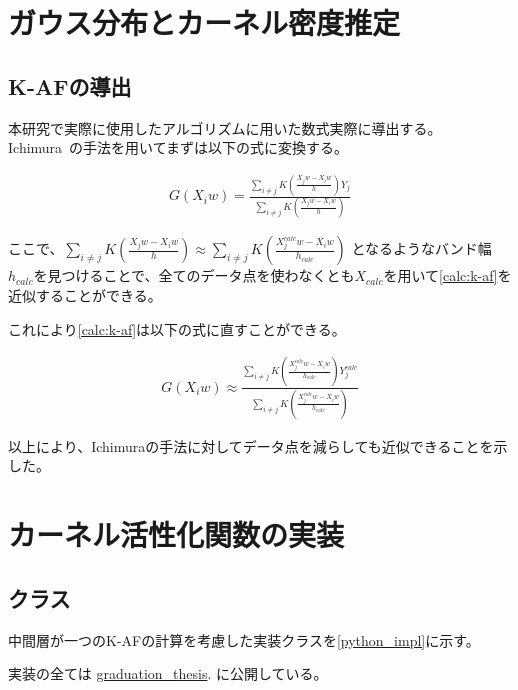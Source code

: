 \appendix
\chapter{ガウス分布とカーネル密度推定}


\section{K-AFの導出}
\label{appendix:calc}

本研究で実際に使用したアルゴリズムに用いた数式実際に導出する。
Ichimura~\cite{ichimura}の手法を用いてまずは以下の式に変換する。


\begin{eqnarray}
G(X_iw)=\frac{\sum_{i\neq j} K\left(\frac{X_j w - X_i w}{h}\right)Y_j}{\sum_{i\neq j} K\left(\frac{X_j w - X_i w}{h}\right)}
\label{calc:k-af}
\end{eqnarray}

ここで、$ \sum_{i\neq j} K\left(\frac{X_j w - X_i w}{h}\right) \approx	\sum_{i\neq j} K\left(\frac{X^{calc}_j w - X_i w}{h_{calc}}\right)$
となるようなバンド幅$ h_{calc} $を見つけることで、全てのデータ点を使わなくとも$ X_{calc} $を用いて\ref{calc:k-af}を近似することができる。

これにより\ref{calc:k-af}は以下の式に直すことができる。

\begin{eqnarray}
G(X_iw) \approx \frac{\sum_{i\neq j} K\left(\frac{X^{calc}_j w - X_i w}{h_{calc}}\right)Y^{calc}_j}{\sum_{i\neq j} K\left(\frac{X^{calc}_j w - X_i w}{h_{calc}}\right)}
\label{calc:k-af-2}
\end{eqnarray}

以上により、Ichimuraの手法に対してデータ点を減らしても近似できることを示した。


\chapter{カーネル活性化関数の実装}
\label{appendix:algorithm}


\section{クラス}


中間層が一つのK-AFの計算を考慮した実装クラスを\ref{python_impl}に示す。

実装の全ては \href{https://github.com/latte0/graduation\_thesis}{graduation\_thesis}. に公開している。

